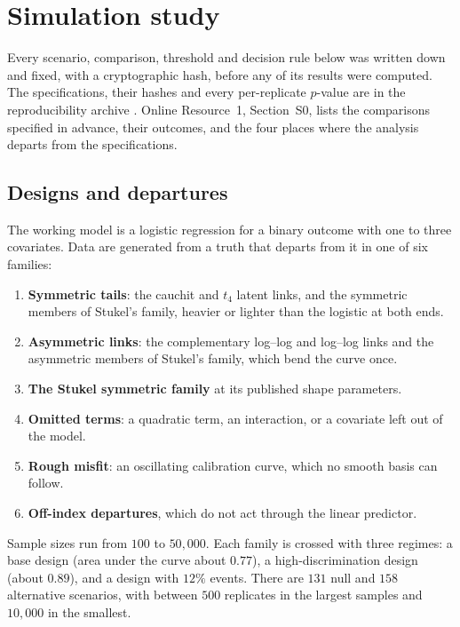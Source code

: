 \section{Simulation study}\label{sec:design}

Every scenario, comparison, threshold and decision rule below was written down and fixed, with a
cryptographic hash, before any of its results were computed. The specifications, their hashes and
every per-replicate $p$-value are in the reproducibility archive \citep{edge2_repro_2026}. Online
Resource~1, Section~S0, lists the comparisons specified in advance, their outcomes, and the four
places where the analysis departs from the specifications.

\subsection{Designs and departures}\label{sec:families}

The working model is a logistic regression for a binary outcome with one to three covariates. Data are
generated from a truth that departs from it in one of six families:
\begin{enumerate}
\item \textbf{Symmetric tails}: the cauchit and $t_4$ latent links, and the symmetric members of
      Stukel's family, heavier or lighter than the logistic at both ends.
\item \textbf{Asymmetric links}: the complementary log--log and log--log links and the asymmetric
      members of Stukel's family, which bend the curve once.
\item \textbf{The Stukel symmetric family} at its published shape parameters.
\item \textbf{Omitted terms}: a quadratic term, an interaction, or a covariate left out of the model.
\item \textbf{Rough misfit}: an oscillating calibration curve, which no smooth basis can follow.
\item \textbf{Off-index departures}, which do not act through the linear predictor.
\end{enumerate}
Sample sizes run from $100$ to $50{,}000$. Each family is crossed with three regimes: a base design
(area under the curve about $0.77$), a high-discrimination design (about $0.89$), and a design with
$12\%$ events. There are $131$ null and $158$ alternative scenarios, with between $500$ replicates in
the largest samples and $10{,}000$ in the smallest.

